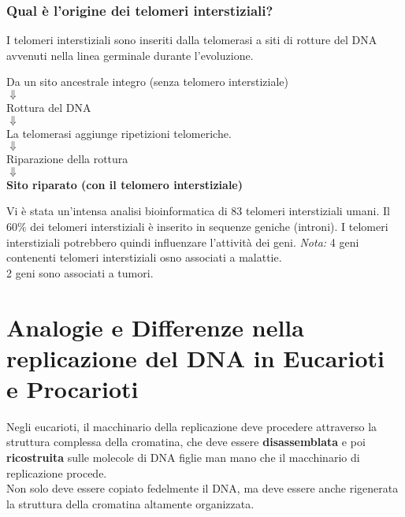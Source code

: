 \documentclass{article}
\begin{document}
\subsubsection{Qual è l'origine dei telomeri interstiziali?} I telomeri interstiziali sono inseriti dalla telomerasi a siti di rotture del DNA avvenuti nella linea germinale durante l'evoluzione.\\
\begin{center}
    Da un sito ancestrale integro (senza telomero interstiziale)\\
    \textbf{$ \Downarrow $}\\
    Rottura del DNA\\
    \textbf{$ \Downarrow $}\\
    La telomerasi aggiunge ripetizioni telomeriche.\\
    \textbf{$ \Downarrow $}\\
    Riparazione della rottura\\
    \textbf{$ \Downarrow $}\\
    \textbf{Sito riparato (con il telomero interstiziale)}
\end{center}
Vi è stata un'intensa analisi bioinformatica di 83 telomeri interstiziali umani. 
Il 60$ \% $ dei telomeri interstiziali è inserito in sequenze geniche (introni).
I telomeri interstiziali potrebbero quindi influenzare l'attività dei geni.
\textit{Nota:} 4 geni contenenti telomeri interstiziali osno associati a malattie.\\
2 geni sono associati a tumori.
\section{Analogie e Differenze nella replicazione del DNA in Eucarioti e Procarioti}Negli eucarioti, il macchinario della replicazione deve procedere attraverso la struttura complessa della cromatina, che deve essere \textbf{disassemblata} e poi \textbf{ricostruita} sulle molecole di DNA figlie man mano che il macchinario di replicazione procede.\\
Non solo deve essere copiato fedelmente il DNA, ma deve essere anche rigenerata la struttura della cromatina altamente organizzata.
\end{document}
